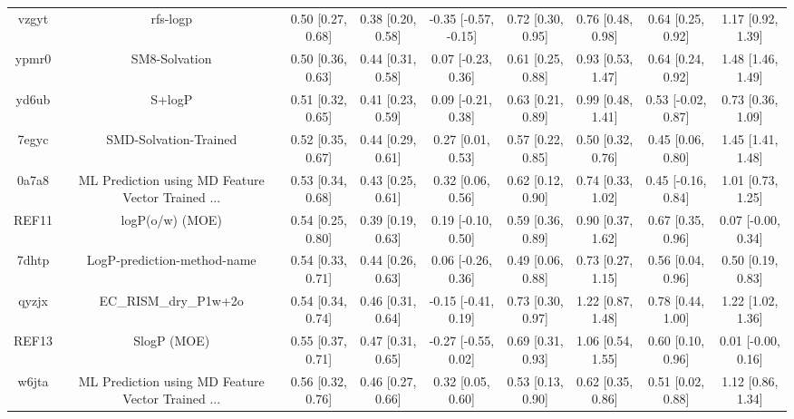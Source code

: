 \documentclass{article}
\begin{document}
\begin{center}
\begin{longtable}{|ccccccccc|}
 vzgyt &                                           rfs-logp &  0.50 [0.27, 0.68] &  0.38 [0.20, 0.58] &  -0.35 [-0.57, -0.15] &  0.72 [0.30, 0.95] &    0.76 [0.48, 0.98] &    0.64 [0.25, 0.92] &     1.17 [0.92, 1.39] \\
 ypmr0 &                                      SM8-Solvation &  0.50 [0.36, 0.63] &  0.44 [0.31, 0.58] &    0.07 [-0.23, 0.36] &  0.61 [0.25, 0.88] &    0.93 [0.53, 1.47] &    0.64 [0.24, 0.92] &     1.48 [1.46, 1.49] \\
 yd6ub &                                             S+logP &  0.51 [0.32, 0.65] &  0.41 [0.23, 0.59] &    0.09 [-0.21, 0.38] &  0.63 [0.21, 0.89] &    0.99 [0.48, 1.41] &   0.53 [-0.02, 0.87] &     0.73 [0.36, 1.09] \\
 7egyc &                              SMD-Solvation-Trained &  0.52 [0.35, 0.67] &  0.44 [0.29, 0.61] &     0.27 [0.01, 0.53] &  0.57 [0.22, 0.85] &    0.50 [0.32, 0.76] &    0.45 [0.06, 0.80] &     1.45 [1.41, 1.48] \\
 0a7a8 &  ML Prediction using MD Feature Vector Trained ... &  0.53 [0.34, 0.68] &  0.43 [0.25, 0.61] &     0.32 [0.06, 0.56] &  0.62 [0.12, 0.90] &    0.74 [0.33, 1.02] &   0.45 [-0.16, 0.84] &     1.01 [0.73, 1.25] \\
 REF11 &                                    logP(o/w) (MOE) &  0.54 [0.25, 0.80] &  0.39 [0.19, 0.63] &    0.19 [-0.10, 0.50] &  0.59 [0.36, 0.89] &    0.90 [0.37, 1.62] &    0.67 [0.35, 0.96] &    0.07 [-0.00, 0.34] \\
 7dhtp &                        LogP-prediction-method-name &  0.54 [0.33, 0.71] &  0.44 [0.26, 0.63] &    0.06 [-0.26, 0.36] &  0.49 [0.06, 0.88] &    0.73 [0.27, 1.15] &    0.56 [0.04, 0.96] &     0.50 [0.19, 0.83] \\
 qyzjx &                              EC\_RISM\_dry\_P1w+2o &  0.54 [0.34, 0.74] &  0.46 [0.31, 0.64] &   -0.15 [-0.41, 0.19] &  0.73 [0.30, 0.97] &    1.22 [0.87, 1.48] &    0.78 [0.44, 1.00] &     1.22 [1.02, 1.36] \\
 REF13 &                                        SlogP (MOE) &  0.55 [0.37, 0.71] &  0.47 [0.31, 0.65] &   -0.27 [-0.55, 0.02] &  0.69 [0.31, 0.93] &    1.06 [0.54, 1.55] &    0.60 [0.10, 0.96] &    0.01 [-0.00, 0.16] \\
 w6jta &  ML Prediction using MD Feature Vector Trained ... &  0.56 [0.32, 0.76] &  0.46 [0.27, 0.66] &     0.32 [0.05, 0.60] &  0.53 [0.13, 0.90] &    0.62 [0.35, 0.86] &    0.51 [0.02, 0.88] &     1.12 [0.86, 1.34] \\

\end{longtable}
\end{center}
\end{document}
